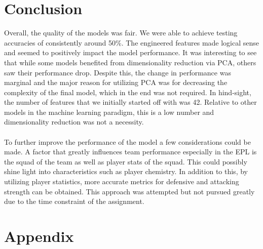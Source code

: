 \documentclass[a4paper,12pt]{article}
\begin{document}
	\section{Conclusion}
	
	Overall, the quality of the models was fair. We were able to achieve testing accuracies of consistently around 50\%. The engineered features made logical sense and seemed to positively impact the model performance. It was interesting to see that while some models benefited from dimensionality reduction via PCA, others saw their performance drop. Despite this, the change in performance was marginal and the major reason for utilizing PCA was for decreasing the complexity of the final model, which in the end was not required. In hind-sight, the number of features that we initially started off with was 42. Relative to other models in the machine learning paradigm, this is a low number and dimensionality reduction was not a necessity. \\
	\\
	To further improve the performance of the model a few considerations could be made. A factor that greatly influences team performance especially in the EPL is the squad of the team as well as player stats of the squad. This could possibly shine light into characteristics such as player chemistry. In addition to this, by utilizing player statistics, more accurate metrics for defensive and attacking strength can be obtained. This approach was attempted but not pursued greatly due to the time constraint of the assignment.
	
	
	\section*{Appendix}
	
\end{document}
